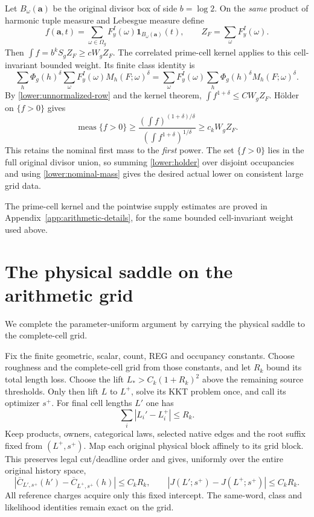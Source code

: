 Let $B_\omega(\mathbf a)$ be the original divisor box of side
$b=\log2$.  On the \emph{same} product of harmonic tuple measure and
Lebesgue measure define
\[
 f(\mathbf a,t)=\sum_{\omega\in\Omega_g}
                 F_y^I(\omega)\mathbf1_{B_\omega(\mathbf a)}(t),
 \qquad Z_F=\sum_\omega F_y^I(\omega).
\]
Then $\int f=b^kS_gZ_F\geq cW_gZ_F$.
The correlated prime-cell kernel applies to this cell-invariant
bounded weight.  Its finite class identity is
\[
 \sum_h\Phi_g(h)^\delta
       \sum_\omega F_y^I(\omega)M_h(F;\omega)^\delta
 =\sum_\omega F_y^I(\omega)
       \sum_h\Phi_g(h)^\delta M_h(F;\omega)^\delta.
\]
By \eqref{lower:unnormalized-row} and the kernel theorem,
$\int f^{1+\delta}\leq CW_gZ_F$.
H\"older on $\{f>0\}$ gives
\begin{equation}
 \operatorname{meas}\{f>0\}
 \geq\frac{(\int f)^{(1+\delta)/\delta}}
            {(\int f^{1+\delta})^{1/\delta}}
 \geq c_kW_gZ_F.
 \label{lower:holder}
\end{equation}
This retains the nominal first mass to the \emph{first} power.  The
set $\{f>0\}$ lies in the full original divisor union, so summing
\eqref{lower:holder} over disjoint occupancies and using
\eqref{lower:nominal-mass} gives the desired actual lower on consistent
large grid data.

The prime-cell kernel and the pointwise supply estimates are proved in
Appendix~\ref{app:arithmetic-details}, for the same bounded cell-invariant
weight used above.

\section{The physical saddle on the arithmetic grid}
\label{lower:frozen}
We complete the parameter-uniform argument by carrying the physical
saddle to the complete-cell grid.

Fix the finite geometric, scalar, count, REG and occupancy constants.
Choose roughness and the complete-cell grid from those constants,
and let $R_k$ bound its total length loss.  Choose the lift $L_*>
C_k(1+R_k)^2$ above the remaining source thresholds.  Only then lift
$L$ to $L^+$, solve its KKT problem once, and call its optimizer $s^+$.
For final cell lengths $L'$ one has
\[
 \sum_i|L_i'-L_i^+|\leq R_k.
\]
Keep products, owners, categorical laws, selected native edges and the
root suffix fixed from $(L^+,s^+)$.  Map each original physical block
affinely to its grid block.  This preserves legal cut/deadline order
and gives, uniformly over the entire original history space,
\begin{equation}
 |\overline C_{L',s^+}(h')-\overline C_{L^+,s^+}(h)|\leq C_kR_k,
 \qquad |J(L';s^+)-J(L^+;s^+)|\leq C_kR_k.
 \label{lower:frozen-defects}
\end{equation}
All reference charges acquire only this fixed intercept.  The
same-word, class and likelihood identities remain exact on the grid.

